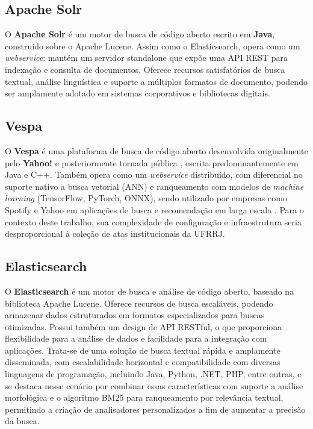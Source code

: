 \subsection{Apache Solr}

O \textbf{Apache Solr} \cite{solr-docs} é um motor de busca de código aberto escrito em \textbf{Java}, construído sobre o Apache Lucene. Assim como o Elasticsearch, opera como um \textit{webservice}: mantém um servidor standalone que expõe uma API REST para indexação e consulta de documentos. Oferece recursos satisfatórios de busca textual, análise linguística e suporte a múltiplos formatos de documento, podendo ser amplamente adotado em sistemas corporativos e bibliotecas digitais.

\subsection{Vespa}

O \textbf{Vespa} \cite{vespa-docs} é uma plataforma de busca de código aberto desenvolvida originalmente pelo \textbf{Yahoo!} e posteriormente tornada pública \cite{vespa-site}, escrita predominantemente em Java e C++. Também opera como um \textit{webservice} distribuído, com diferencial no suporte nativo a busca vetorial (ANN) e ranqueamento com modelos de \textit{machine learning} (TensorFlow, PyTorch, ONNX), sendo utilizado por empresas como Spotify e Yahoo em aplicações de busca e recomendação em larga escala \cite{vespa-site}. Para o contexto deste trabalho, sua complexidade de configuração e infraestrutura seria desproporcional à coleção de atas institucionais da UFRRJ.

\subsection{Elasticsearch}

O \textbf{Elasticsearch} \cite{IBMElasticsearch} é um motor de busca e análise de código aberto, baseado na biblioteca Apache Lucene. Oferece recursos de busca escaláveis, podendo armazenar dados estruturados em formatos especializados para buscas otimizadas. Possui também um design de API RESTful, o que proporciona flexibilidade para a análise de dados e facilidade para a integração com aplicações. Trata-se de uma solução de busca textual rápida e amplamente disseminada, com escalabilidade horizontal e compatibilidade com diversas linguagens de programação, incluindo Java, Python, .NET, PHP, entre outras, e se destaca nesse cenário por combinar essas características com suporte a análise morfológica e o algoritmo BM25 para ranqueamento por relevância textual, permitindo a criação de analisadores personalizados a fim de aumentar a precisão da busca.

